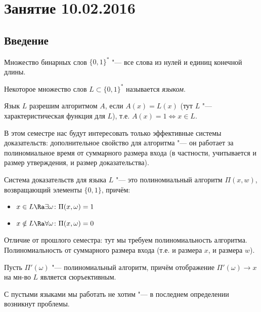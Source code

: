 \chapter{Занятие 10.02.2016}
\section{Введение}

\begin{Def}
	Множество бинарных слов $\{0, 1\}^*$ "--- все слова из нулей и единиц конечной длины.
\end{Def}

\begin{Def}
	Некоторое множество слов $L \subset \{0, 1\}^*$ называется \textit{языком}.
\end{Def}

\begin{Def}
	Язык $L$ разрешим алгоритмом $A$, если $A(x)=L(x)$ (тут $L$ "--- характеристическая функция для $L$),
	т.е. $A(x) = 1 \iff x \in L$.
\end{Def}

В этом семестре нас будут интересовать только эффективные системы доказательств:
дополнительное свойство для алгоритма "--- он работает за полиномиальное время
от суммарного размера входа (в частности, учитывается и размер утверждения, и размер доказательства).

\begin{Def}
	Система доказательств для языка $L$ "--- это полиномиальный 
	алгоритм $\Pi(x, w)$, возвращающий элементы $\{0, 1\}$, причём:
	\begin{itemize}
		\item $x    \in L \Ra \exists \omega \colon \Pi(x, \omega) = 1$
		\item $x \notin L \Ra \forall \omega \colon \Pi(x, \omega) = 0$
	\end{itemize}
\end{Def}
\begin{Rem}
	Отличие от прошлого семестра: тут мы требуем полиномиальность алгоритма.
	Полиномиальность от суммарного размера входа (т.е. и размера $x$, и размера $w$).
\end{Rem}

\begin{Def}
	Пусть $\Pi'(\omega)$ "--- полиномиальный алгоритм, причём отображение
	$\Pi'(\omega) \to x$ на мн-во $L$ является сюръективным.
\end{Def}

С пустыми языками мы работать не хотим "--- в последнем определении возникнут проблемы.

